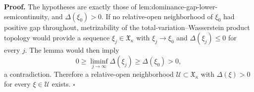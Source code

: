 \textbf{Proof.}
The hypotheses are exactly those of lem:dominance-gap-lower-semicontinuity, and \(\Delta(\xi_0)>0\).  If no relative-open neighborhood of \(\xi_0\) had positive gap throughout, metrizability of the total-variation--Wasserstein product topology would provide a sequence \(\xi_j\in\mathfrak X_\kappa\) with \(\xi_j\to\xi_0\) and \(\Delta(\xi_j)\le0\) for every \(j\).  The lemma would then imply
\[
0\ge\liminf_{j\to\infty}\Delta(\xi_j)\ge\Delta(\xi_0)>0,
\]
a contradiction.  Therefore a relative-open neighborhood \(\mathcal U\subset\mathfrak X_\kappa\) with \(\Delta(\xi)>0\) for every \(\xi\in\mathcal U\) exists. \(\square\)